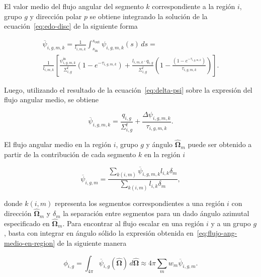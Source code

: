 \documentclass[11pt]{article}
\numberwithin{equation}{section}
\begin{document}
El valor medio del flujo angular del segmento $k$ correspondiente a la región $i$, grupo $g$ y dirección polar $p$ se obtiene integrando la soluci\'on de la ecuación~\eqref{eq:edo-disc} de la siguiente forma

\begin{multline}
 \overline{\psi}_{i,g,m,k} =
 \frac{1}{l_{i,m,k}} \int_{s_{\text{in}}}^{s_{\text{out}}} \psi_{i,g,m,k} (s) \, ds = \\
 \frac{1}{l_{i,m,k}} \left[ \frac{\psi^{\text{in}}_{i,g,m,k}}{\Sigma^t_{i,g}} \left(1 - e^{-\tau_{i,g,m,k}} \right) + \frac{l_{i,m,k} \cdot q_{i,g}}{\Sigma^t_{i,g}} \left( 1 - \frac{\left(1 - e^{-\tau_{i,g,m,k}} \right)}{\tau_{i,g,m,k}} \right) \right].
\end{multline}

\noindent
Luego, utilizando el resultado de la ecuación~\eqref{eq:delta-psi} sobre la expresi\'on del flujo angular medio, se obtiene

\begin{equation} \label{eq:flujo-ang-medio-en-segmento}
 \overline{\psi}_{i,g,m,k} = \frac{q_{i,g}}{\Sigma^t_{i,g}} + \frac{\Delta \psi_{i,g,m,k}}{\tau_{i,g,m,k}}.
\end{equation}

El flujo angular medio en la región $i$, grupo $g$ y ángulo $\boldsymbol{\hat{\Omega}}_m$ puede ser obtenido a partir de la contribuci\'on de cada segmento $k$ en la región $i$

\begin{equation} \label{eq:flujo-ang-medio-en-region}
 \overline{\psi}_{i,g,m} = \frac{\sum_{k(i,m)} \overline{\psi}_{i,g,m,k} l_{i,k} \delta_m}{\sum_{k(i,m)} l_{i,k} \delta_m},
\end{equation}

\noindent
donde $k(i,m)$ representa los segmentos correspondientes a una región $i$ con dirección $\boldsymbol{\hat{\Omega}}_m$ y $\delta_m$ la separaci\'on entre segmentos para un dado ángulo azimutal especificado en $\boldsymbol{\hat{\Omega}}_m$. Para encontrar al flujo escalar en una región $i$ y a un grupo $g$, basta con integrar en ángulo s\'olido la expresi\'on obtenida en~\eqref{eq:flujo-ang-medio-en-region} de la siguiente manera

\begin{equation} \label{eq:flujo-escalar-1}
 \phi_{i,g} = \int_{4\pi} \overline{\psi}_{i,g} (\boldsymbol{\hat{\Omega}}) \, d\boldsymbol{\hat{\Omega}} \approx 
 4\pi \sum_m w_m \overline{\psi}_{i,g,m}.
\end{equation}
\end{document}
